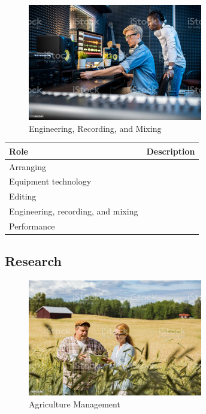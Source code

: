 \begin{figure}[H]
	\begin{center}
		\caption{Engineering, Recording, and Mixing}
		\vskip 4pt
		\includegraphics[height=2in]{images/careers/istockphoto-1176082646-1024x1024.jpg}
	\end{center}
\end{figure}

\begin{table}[H]
	\begin{center}
		\begin{tabular}{p{1in}|p{3.4in}} 
			\textbf{Role} & \textbf{Description}\\
			\hline
			Arranging & \\
			\hline
			Equipment technology & \\
			\hline
			Editing & \\
			\hline
			Engineering, recording, and mixing & \\
			\hline
			Performance & \\
			\hline
		\end{tabular}
	\end{center}
\end{table}

\subsection{Research}

\begin{figure}[H]
	\begin{center}
		\caption{Agriculture Management}
		\vskip 4pt
		\includegraphics[height=2in]{images/careers/istockphoto-1272791496-1024x1024.jpg}
	\end{center}
\end{figure}

